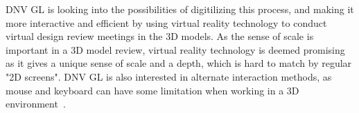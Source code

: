 DNV GL is looking into the possibilities of digitilizing this process, and making it more interactive and efficient by using
virtual reality technology to conduct virtual design review meetings in the 3D models. 
As the sense of scale is important in a 3D model review, virtual reality technology is deemed promising as it gives a unique sense of scale
and a depth, which is hard to match by regular "2D screens". DNV GL is also interested in alternate interaction methods, as mouse and keyboard 
can have some limitation when working in a 3D environment~\citep{Rautaray2015}. 

